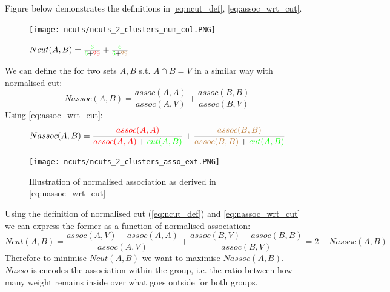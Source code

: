 \documentclass[a4paper]{article}
\begin{document}
Figure below demonstrates the definitions in \eqref{eq:ncut_def}, \eqref{eq:assoc_wrt_cut}.
\begin{figure}[H]
	\centering %
    	\texttt{[image: ncuts/ncuts\_2\_clusters\_num\_col.PNG]}
    \caption{$Ncut(A,B) = 
    \frac{\textcolor{green}{6}}
    {\textcolor{green}{6}+\textcolor{red}{29} } +
    \frac{\textcolor{green}{6}}
    {\textcolor{green}{6}+\textcolor{brown}{29}}$
    }
\end{figure}
We can define the  for two sets $A,B$ s.t. $A \cap B = V$ in a similar way with normalised cut:
\begin{equation}
    Nassoc(A,B) = \frac{assoc(A,A)}{assoc(A,V)} +\frac{assoc(B,B)}{assoc(B,V)}  
    \label{eq:nassoc_def}
\end{equation}
Using \eqref{eq:assoc_wrt_cut}:
\begin{equation}
    Nassoc(A,B) = 
    \frac{\textcolor{red}{assoc(A,A)}}{\textcolor{red}{assoc(A,A)} + \textcolor{green}{cut(A,B)}} + 
    \frac{\textcolor{brown}{assoc(B,B)}}{\textcolor{brown}{assoc(B,B)} + \textcolor{green}{cut(A,B)}} 
    \label{eq:nassoc_wrt_cut}
\end{equation}
\begin{figure}[H]
	\centering %
    	\texttt{[image: ncuts/ncuts\_2\_clusters\_asso\_ext.PNG]}
    \caption{Illustration of normalised association as derived in \ref{eq:nassoc_wrt_cut}}
\end{figure}
Using the definition of normalised cut (\eqref{eq:ncut_def}) and \eqref{eq:nassoc_wrt_cut} we can express the former as a function of normalised association:
\begin{equation}
    Ncut(A,B) = \frac{assoc(A,V) - assoc(A,A) }{assoc(A,V)} + \frac{assoc(B,V) - assoc(B,B) }{assoc(B,V)} = 2 - Nassoc(A,B)
\end{equation}
Therefore to minimise $Ncut(A,B)$ we want to maximise $Nassoc(A,B)$. $Nasso$ is encodes the association within the group, i.e. the ratio between how many weight remains inside over what goes outside for both groups.
\end{document}
